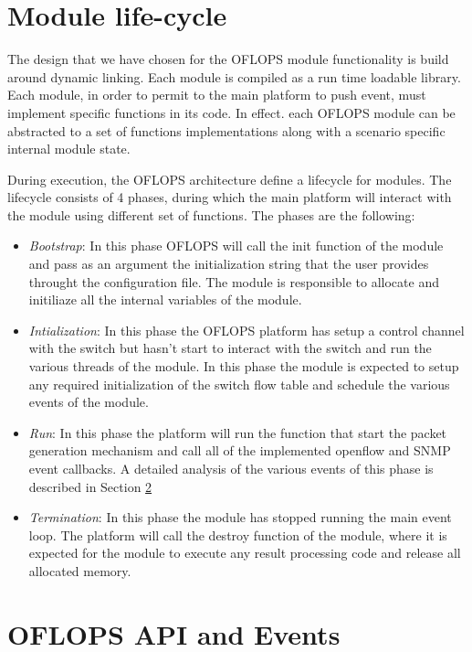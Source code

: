 \documentclass{book}
\begin{document}
\section{Module life-cycle}

The design that we have chosen for the OFLOPS module functionality is build around dynamic linking. Each module
is compiled as a run time loadable library. Each module, in order to permit to the main platform to push event,
must implement specific functions in its code. In effect. each OFLOPS module
can be abstracted to a set of functions implementations along with a scenario specific internal module state.

During execution, the OFLOPS architecture define a lifecycle for modules. The
lifecycle consists of 4 phases, during which the main platform will interact
with the module using different set of functions. The phases are the following:
\begin{itemize}
\item \textit{Bootstrap}: In this phase OFLOPS will call the init function of
    the module and pass as an argument
the initialization string that the user provides throught the configuration file. The module is responsible to 
allocate and initiliaze all the internal variables of the module. 
\item \textit{Intialization}: In this phase the OFLOPS platform has setup a control channel with the switch but hasn't 
start to interact with the switch and run the various threads of the module. In this phase the module is expected 
to setup any required initialization of the switch flow table and schedule the various events of the module. 
\item \textit{Run}: In this phase the platform will run the function that start the packet generation mechanism and 
call all of the implemented openflow and SNMP event callbacks. A detailed analysis of the various events of this phase
is described in Section \ref{OFLOPS_API}
\item \textit{Termination}: In this phase the module has stopped running the main event loop. The platform will call the 
destroy function of the module, where it is expected for the module to execute any result processing code and release 
all allocated memory. 
\end{itemize}

\section{OFLOPS API and Events}
\label{OFLOPS_API}
\end{document}
